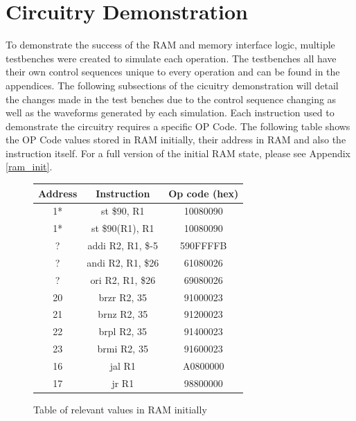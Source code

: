 \documentclass{article}
\begin{document}
\section{Circuitry Demonstration}
    To demonstrate the success of the RAM and memory interface logic, multiple testbenches were created to simulate each operation. 
    The testbenches all have their own control sequences unique to every operation and can be found in the appendices. The following subsections 
    of the cicuitry demonstration will detail the changes made in the test benches due to the control sequence changing as well as the waveforms generated by each simulation.
    Each instruction used to demonstrate the circuitry requires a specific OP Code. The following table shows the OP Code values stored in RAM initially, their address in RAM and also the instruction itself. For a full version of the initial RAM state, please see Appendix \ref{ram_init}.
    \begin{figure}[h!] \label{relevant_ram_init}
        \begin{center}
            \begin{tabular}{|c|c|c|}
                \hline
                Address & Instruction & Op code (hex) \\
                \hline
                1* & st \$90, R1 & 10080090 \\ %
                \hline
                1* & st \$90(R1), R1 & 10080090 \\ %
                \hline
                ? & addi R2, R1, \$-5 & 590FFFFB \\
                \hline
                ? & andi R2, R1, \$26 & 61080026 \\
                \hline
                ? & ori R2, R1, \$26 & 69080026 \\
                \hline
                20 & brzr R2, 35 & 91000023 \\
                \hline
                21 & brnz R2, 35 & 91200023 \\
                \hline
                22 & brpl R2, 35 & 91400023 \\
                \hline
                23 & brmi R2, 35 & 91600023 \\
                \hline
                16 & jal R1 & A0800000 \\ %
                \hline
                17 & jr R1 & 98800000 \\ %
                \hline
            \end{tabular}
            \caption{Table of relevant values in RAM initially}
        \end{center}
    \end{figure}
\end{document}
